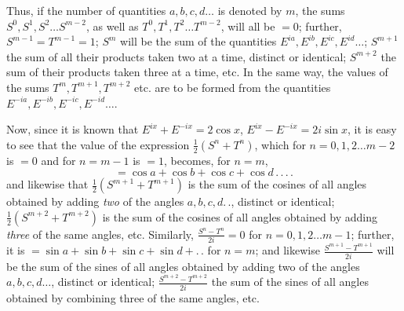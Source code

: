 Thus, if the number of quantities $a,b,c,d\ldots$ is denoted by $m$, the sums $S^0,S^1,S^2\ldots S^{m-2}$, as well as $T^0,T^1,T^2\ldots T^{m-2}$, will all be $=0$; further, $S^{m-1}=T^{m-1}=1$; $S^m$ will be the sum of the quantities $E^{ia},E^{ib},E^{ic},E^{id}\ldots$; $S^{m+1}$ the sum of all their products taken two at a time, distinct or identical; $S^{m+2}$ the sum of their products taken three at a time, etc. In the same way, the values of the sums $T^m,T^{m+1},T^{m+2}$ etc. are to be formed from the quantities $E^{-ia},E^{-ib},E^{-ic},E^{-id}\ldots$.

Now, since it is known that $E^{ix}+E^{-ix}=2\cos x$, $E^{ix}-E^{-ix}=2i\sin x$, it is easy to see that the value of the expression $\frac12(S^n+T^n)$, which for $n=0,1,2\ldots m-2$ is $=0$ and for $n=m-1$ is $=1$, becomes, for $n=m$,
\[
=\cos a+\cos b+\cos c+\cos d\,.\,.\,.\,.
\]
and likewise that $\frac12(S^{m+1}+T^{m+1})$ is the sum of the cosines of all angles obtained by adding \textit{two} of the angles $a,b,c,d.\,.$, distinct or identical; $\frac12(S^{m+2}+T^{m+2})$ is the sum of the cosines of all angles obtained by adding \textit{three} of the same angles, etc. Similarly, $\frac{S^n-T^n}{2i}=0$ for $n=0,1,2\ldots m-1$; further, it is $=\sin a+\sin b+\sin c+\sin d+.\,.$ for $n=m$; and likewise $\frac{S^{m+1}-T^{m+1}}{2i}$ will be the sum of the sines of all angles obtained by adding two of the angles $a,b,c,d\ldots$, distinct or identical; $\frac{S^{m+2}-T^{m+2}}{2i}$ the sum of the sines of all angles obtained by combining three of the same angles, etc.

